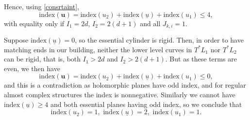 \documentclass[12pt]{amsart}
\theoremstyle{definition}
\begin{document}
Hence, using \eqref{consrtaint},
\begin{equation*}
    \mathrm{index}(\mathbf{u}) = \mathrm{index}(u_2)+\mathrm{index}(\underline{u})+\mathrm{index}(u_1) \leq 4,
\end{equation*}
with equality only if $I_1=2d$, $I_2=2(d+1)$ and all $J_{k,i}=1$.

Suppose $\mathrm{index}(\underline{u})=0$, so the essential cylinder is rigid. Then, in order to have matching ends in our building, neither the lower level curves in $T^* L_1$ nor $T^* L_2$ can be rigid, that is, both $I_1 > 2d$ and $I_2 > 2(d+1)$. But as these terms are even, we then have $$\mathrm{index}(\mathbf{u}) = \mathrm{index}(u_2)+\mathrm{index}(\underline{u})+\mathrm{index}(u_1)  \leq 0,$$ and this is a contradiction as holomorphic planes have odd index, and for regular almost complex structures the index is nonnegative.
Similarly we cannot have $\mathrm{index}(\underline{u}) \ge 4$ and both essential planes having odd index, so we conclude that
\begin{equation*}
    \mathrm{index}(u_2)=1, \, \, \mathrm{index}(\underline{u})=2, \, \, \mathrm{index}(u_1)=1.
\end{equation*}





\end{document}
